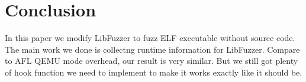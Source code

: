 
\section{Conclusion}
\label{sec:conclusion}

In this paper we modify LibFuzzer to fuzz ELF executable without source code.
The main work we done is collectng runtime information for LibFuzzer.
Compare to AFL QEMU mode overhead, our result is very similar.
But we still got plenty of hook function we need to implement to make it works exactly like it should be.
